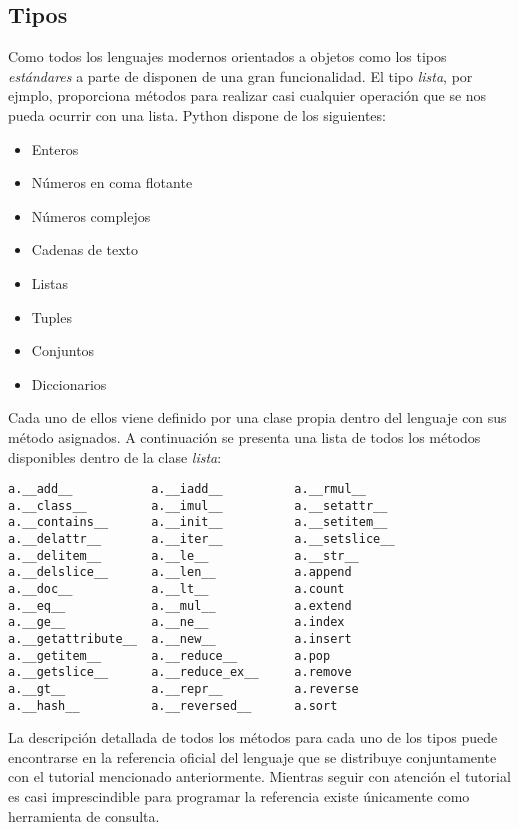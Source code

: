 \documentclass[a4paper,10pt]{article}
\begin{document}
\subsection{Tipos}

Como todos los lenguajes modernos orientados a objetos como los tipos
\emph{estándares} a parte de disponen de una gran funcionalidad. El tipo
\emph{lista}, por ejmplo, proporciona métodos para realizar casi
cualquier operación que se nos pueda ocurrir con una lista.  Python
dispone de los siguientes:

\begin{itemize}
\item Enteros
\item Números en coma flotante
\item Números complejos
\item Cadenas de texto
\item Listas
\item Tuples
\item Conjuntos
\item Diccionarios
\end{itemize}

Cada uno de ellos viene definido por una clase propia dentro del
lenguaje con sus método asignados.  A continuación se presenta una
lista de todos los métodos disponibles dentro de la clase
\emph{lista}:

\begin{lstlisting}
a.__add__           a.__iadd__          a.__rmul__
a.__class__         a.__imul__          a.__setattr__
a.__contains__      a.__init__          a.__setitem__
a.__delattr__       a.__iter__          a.__setslice__
a.__delitem__       a.__le__            a.__str__
a.__delslice__      a.__len__           a.append
a.__doc__           a.__lt__            a.count
a.__eq__            a.__mul__           a.extend
a.__ge__            a.__ne__            a.index
a.__getattribute__  a.__new__           a.insert
a.__getitem__       a.__reduce__        a.pop
a.__getslice__      a.__reduce_ex__     a.remove
a.__gt__            a.__repr__          a.reverse
a.__hash__          a.__reversed__      a.sort
\end{lstlisting}

La descripción detallada de todos los métodos para cada uno de los
tipos puede encontrarse en la referencia oficial del lenguaje
\cite{REF} que se distribuye conjuntamente con el tutorial mencionado
anteriormente.  Mientras seguir con atención el tutorial es casi
imprescindible para programar la referencia existe únicamente como
herramienta de consulta.
\end{document}
